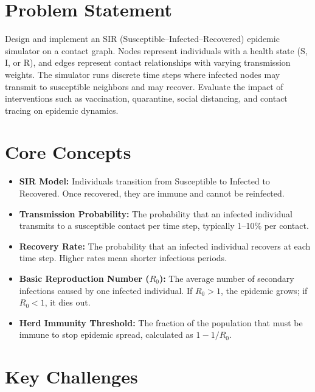 \section{Problem Statement}

Design and implement an SIR (Susceptible--Infected--Recovered) epidemic simulator on a contact graph. Nodes represent individuals with a health state (S, I, or R), and edges represent contact relationships with varying transmission weights. The simulator runs discrete time steps where infected nodes may transmit to susceptible neighbors and may recover. Evaluate the impact of interventions such as vaccination, quarantine, social distancing, and contact tracing on epidemic dynamics.

\section{Core Concepts}

\begin{itemize}
  \item \textbf{SIR Model:} Individuals transition from Susceptible to Infected to Recovered. Once recovered, they are immune and cannot be reinfected.
  \item \textbf{Transmission Probability:} The probability that an infected individual transmits to a susceptible contact per time step, typically 1--10\% per contact.
  \item \textbf{Recovery Rate:} The probability that an infected individual recovers at each time step. Higher rates mean shorter infectious periods.
  \item \textbf{Basic Reproduction Number ($R_0$):} The average number of secondary infections caused by one infected individual. If $R_0 > 1$, the epidemic grows; if $R_0 < 1$, it dies out.
  \item \textbf{Herd Immunity Threshold:} The fraction of the population that must be immune to stop epidemic spread, calculated as $1 - 1/R_0$.
\end{itemize}

\section{Key Challenges}

